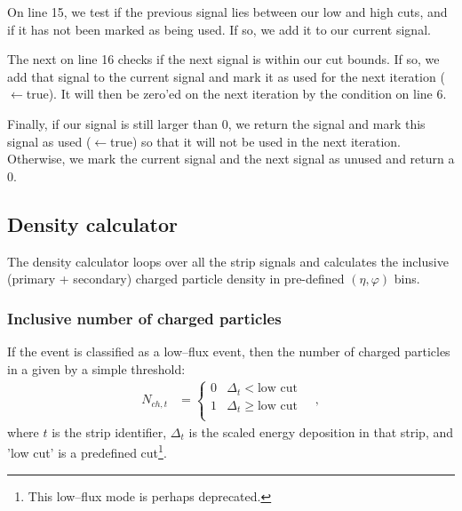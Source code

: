 \documentclass[11pt]{article}
\begin{document}
On line 15, we test if the previous signal lies between our low and
high cuts, and if it has not been marked as being used.  If so, we add
it to our current signal.  

The next  on line 16 checks if the next signal is within our
cut bounds.  If so, we add that signal to the current signal and mark
it as used for the next iteration ($\leftarrow$true).  It will then be zero'ed on the next
iteration by the condition on line 6.

Finally, if our signal is still larger than 0, we return the signal
and mark this signal as used ($\leftarrow$true) so that it will not be used in the next
iteration. Otherwise, we mark the current signal and the next signal
as unused and return a 0. 


\subsection{Density calculator}

The density calculator loops over all the strip signals and calculates
the inclusive (primary + secondary) charged particle density in
pre-defined $(\eta,\varphi)$ bins.  

\subsubsection{Inclusive number of charged particles} 

If the event is classified as a low--flux event, then the number of
charged particles in a given by a simple threshold: 
\begin{align}
  N_{ch,t} &= \left\{
    \begin{array}{cl}
      0 & \Delta_t < \text{low cut}\\ 
      1 & \Delta_t \ge \text{low cut}\\ 
    \end{array}\right.\quad,
\end{align}
where $t$ is the strip identifier, $\Delta_t$ is the scaled energy
deposition in that strip, and 'low cut' is a predefined
cut\footnote{This low--flux mode is perhaps deprecated.}.  
\end{document}
